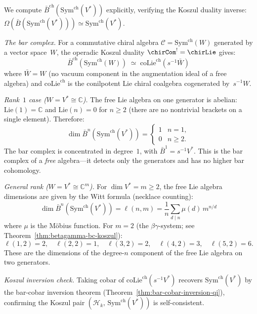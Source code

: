 \begin{computation}
\label{comp:bar-sym-ch}
We compute $\bar{B}^{\mathrm{ch}}(\mathrm{Sym}^{\mathrm{ch}}(V^*))$
explicitly, verifying the Koszul duality inverse:
$\Omega(\bar{B}(\mathrm{Sym}^{\mathrm{ch}}(V^*)))
\simeq \mathrm{Sym}^{\mathrm{ch}}(V^*)$.

\emph{The bar complex.}
For a commutative chiral algebra $\mathcal{C} = \mathrm{Sym}^{\mathrm{ch}}(W)$
generated by a vector space~$W$, the operadic Koszul duality
${\chirCom}^! = \chirLie$ gives:
\[
\bar{B}^{\mathrm{ch}}(\mathrm{Sym}^{\mathrm{ch}}(W))
\;\simeq\;
\mathrm{coLie}^{\mathrm{ch}}(s^{-1}\bar{W})
\]
where $\bar{W} = W$ (no vacuum component in the augmentation ideal
of a free algebra) and $\mathrm{coLie}^{\mathrm{ch}}$ is the
conilpotent Lie chiral coalgebra cogenerated by~$s^{-1}W$.

\emph{Rank~$1$ case ($W = V^* \cong \mathbb{C}$).}
The free Lie algebra on one generator is abelian: $\mathrm{Lie}(1) = \mathbb{C}$
and $\mathrm{Lie}(n) = 0$ for $n \geq 2$
(there are no nontrivial brackets on a single element).
Therefore:
\begin{equation}\label{eq:bar-sym-rank1}
\dim \bar{B}^n(\mathrm{Sym}^{\mathrm{ch}}(V^*)) =
\begin{cases}
1 & n = 1, \\
0 & n \geq 2.
\end{cases}
\end{equation}
The bar complex is concentrated in degree~$1$, with
$\bar{B}^1 = s^{-1}V^*$.  This is the bar complex of a
\emph{free} algebra---it detects only the generators and has
no higher bar cohomology.

\emph{General rank ($W = V^* \cong \mathbb{C}^m$).}
For $\dim V^* = m \geq 2$, the free Lie algebra dimensions
are given by the Witt formula (necklace counting):
\[
\dim \bar{B}^n(\mathrm{Sym}^{\mathrm{ch}}(V^*))
= \ell(n, m) = \frac{1}{n}\sum_{d \mid n} \mu(d)\, m^{n/d}
\]
where $\mu$ is the M\"obius function.  For $m = 2$
(the $\beta\gamma$-system; see Theorem~\ref{thm:betagamma-bc-koszul}):
\[
\ell(1,2) = 2,\quad
\ell(2,2) = 1,\quad
\ell(3,2) = 2,\quad
\ell(4,2) = 3,\quad
\ell(5,2) = 6.
\]
These are the dimensions of the degree-$n$ component of the
free Lie algebra on two generators.

\emph{Koszul inversion check.}
Taking cobar of $\mathrm{coLie}^{\mathrm{ch}}(s^{-1}V^*)$
recovers $\mathrm{Sym}^{\mathrm{ch}}(V^*)$ by the
bar-cobar inversion theorem
(Theorem~\ref{thm:bar-cobar-inversion-qi}), confirming the
Koszul pair $(\mathcal{H}_k,\,
\mathrm{Sym}^{\mathrm{ch}}(V^*))$ is self-consistent.
\end{computation}

